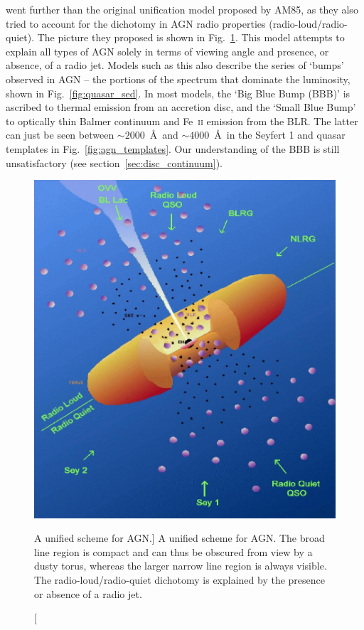 \citet[][UP95]{UP95} went further than the original unification model
proposed by AM85, as they also tried to account for the dichotomy in 
AGN radio properties (radio-loud/radio-quiet).
The picture they proposed is shown in Fig.~\ref{fig:unification}.
This model attempts to explain all types of AGN 
solely in terms of viewing angle
and presence, or absence, of a radio jet. Models such as this also 
describe the series of `bumps' observed in AGN -- the portions
of the spectrum that dominate the luminosity, shown in Fig.~\ref{fig:quasar_sed}. 
In most models, the `Big Blue Bump (BBB)' is ascribed to thermal 
emission from an accretion disc, and the `Small Blue Bump' to optically 
thin Balmer continuum and Fe~\textsc{ii} emission from the BLR.
The latter can just be seen between $\sim2000$~\AA\ and 
$\sim4000$~\AA\ in the Seyfert 1 and 
quasar templates in Fig.~\ref{fig:agn_templates}.
Our understanding of the BBB is still unsatisfactory 
(see section~\ref{sec:disc_continuum}).

\begin{figure}
\centering
\includegraphics[width=1.0\textwidth]{figures/01-intro/up95.png}
\caption
[A unified scheme for AGN.]
{
A unified scheme for AGN. The broad line region is compact and can thus
be obscured from view by a dusty torus, whereas the larger narrow line region
is always visible. The radio-loud/radio-quiet dichotomy is explained by
the presence or absence of a radio jet.
} 
\label{fig:unification}
\end{figure} 

